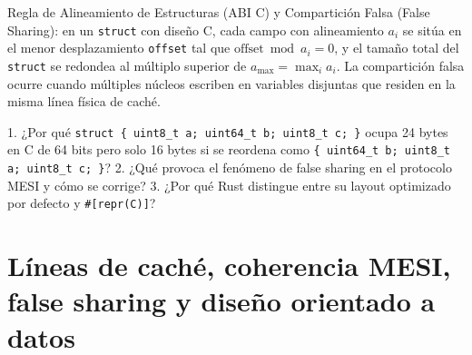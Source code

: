 \documentclass{book}
\begin{document}
\begin{tcolorbox}[title={Definición}, studiumdef, breakable]

Regla de Alineamiento de Estructuras (ABI C) y Compartición Falsa (False Sharing): en un \texttt{struct} con diseño C, cada campo con alineamiento \(a_i\) se sitúa en el menor desplazamiento \texttt{offset} tal que \(\text{offset} \bmod a_i = 0\), y el tamaño total del \texttt{struct} se redondea al múltiplo superior de \(a_{\max} = \max_i a_i\). La compartición falsa ocurre cuando múltiples núcleos escriben en variables disjuntas que residen en la misma línea física de caché.
\end{tcolorbox}

\begin{tcolorbox}[title={Autoficha}, studiumcheck, breakable]

1. ¿Por qué \texttt{struct \{ uint8\_t a; uint64\_t b; uint8\_t c; \}} ocupa 24 bytes en C de 64 bits pero solo 16 bytes si se reordena como \texttt{\{ uint64\_t b; uint8\_t a; uint8\_t c; \}}? 2. ¿Qué provoca el fenómeno de false sharing en el protocolo MESI y cómo se corrige? 3. ¿Por qué Rust distingue entre su layout optimizado por defecto y \texttt{\#[repr(C)]}?
\end{tcolorbox}

\section{Líneas de caché, coherencia MESI, false sharing y diseño orientado a datos}
\end{document}
